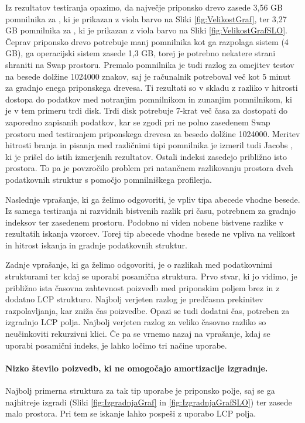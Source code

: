 Iz rezultatov testiranja opazimo, da največje priponsko drevo zasede 3,56 GB pomnilnika za \DNK, ki je prikazan z viola barvo na Sliki \ref{fig:VelikostGraf}, ter 3,27 GB pomnilnika za \NK, ki je prikazan z viola barvo na Sliki \ref{fig:VelikostGrafSLO}. Čeprav priponsko drevo potrebuje manj pomnilnika kot ga razpolaga sistem (4 GB), ga operacijski sistem zasede 1,3 GB, torej je potrebno nekatere strani shraniti na Swap prostoru. Premalo pomnilnika je tudi razlog za omejitev testov na besede dolžine 1024000 znakov, saj je računalnik potreboval več kot 5 minut za gradnjo enega priponskega drevesa. Ti rezultati so v skladu z razliko v hitrosti dostopa do podatkov med notranjim pomnilnikom in zunanjim pomnilnikom, ki je v tem primeru trdi disk. Trdi disk potrebuje 7-krat več časa za dostopati do zaporedno zapisanih podatkov, kar se zgodi pri ne polno zasedenem Swap prostoru med testiranjem priponskega drevesa za besedo dolžine 1024000. Meritev hitrosti branja in pisanja med različnimi tipi pomnilnika je izmeril tudi Jacobs \cite{Jacobs2009}, ki je prišel do istih izmerjenih rezultatov. Ostali indeksi zasedejo približno isto prostora. To pa je povzročilo problem pri natančnem razlikovanju prostora dveh podatkovnih struktur s pomočjo pomnilniškega profilerja.

Naslednje vprašanje, ki ga želimo odgovoriti, je vpliv tipa abecede vhodne besede. Iz samega testiranja ni razvidnih bistvenih razlik pri času, potrebnem za gradnjo indeksov ter zasedenem prostoru. Podobno ni viden nobene bistvene razlike v rezultatih iskanja vzorcev. Torej tip abecede vhodne besede ne vpliva na velikost in hitrost iskanja in gradnje podatkovnih struktur.

Zadnje vprašanje, ki ga želimo odgovoriti, je o razlikah med podatkovnimi strukturami ter kdaj se uporabi posamična struktura. Prvo stvar, ki jo vidimo, je približno ista časovna zahtevnost poizvedb med priponskim poljem brez in z dodatno LCP strukturo. Najbolj verjeten razlog je predčasna prekinitev razpolavljanja, kar zniža čas poizvedbe. Opazi se tudi dodatni čas, potreben za izgradnjo LCP polja. Najbolj verjeten razlog za veliko časovno razliko so neučinkoviti rekurzivni klici. Če pa se vrnemo nazaj na vprašanje, kdaj se uporabi posamični indeks, je lahko ločimo tri načine uporabe. 
\paragraph{Nizko število poizvedb, ki ne omogočajo amortizacije izgradnje.} 
Najbolj primerna struktura za tak tip uporabe je priponsko polje, saj se ga najhitreje izgradi (Sliki \ref{fig:IzgradnjaGraf} in \ref{fig:IzgradnjaGrafSLO}) ter zasede malo prostora. Pri tem se iskanje lahko pospeši z uporabo LCP polja. 


